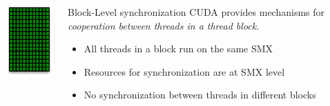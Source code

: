 \begin{frame}[fragile]{}
    \begin{columns}[T]
        \begin{column}{0.3\textwidth}
            \includegraphics[width=\textwidth]{./images/smx.pdf}
        \end{column}

        \begin{column}{0.7\textwidth}
            \begin{info}{Block-Level synchronization}
            CUDA provides mechanisms for \emph{cooperation between threads in a thread block}.
            \begin{itemize}
                \item All threads in a block run on the same SMX
                \item Resources for synchronization are at SMX level
                \item No synchronization between threads in different blocks
            \end{itemize}
            \end{info}
        \end{column}
    \end{columns}

\end{frame}

